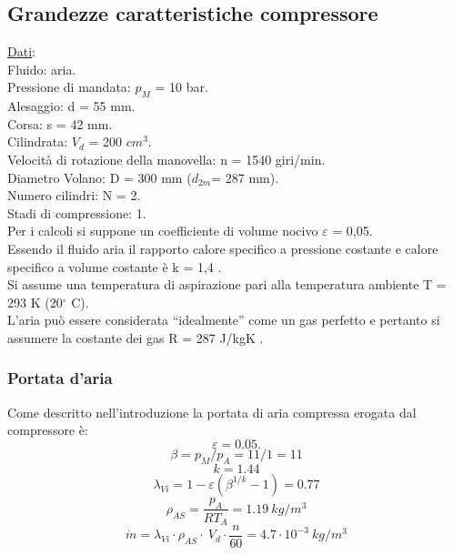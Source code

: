 \subsection{Grandezze caratteristiche compressore}

\underline{Dati}: \\
Fluido: aria. \\
Pressione di mandata: $p_M$ = 10 bar.\\
Alesaggio: d = 55 mm.\\
Corsa: s = 42 mm.\\
Cilindrata: $V_d$ = 200 $cm^3$.\\
Velocità di rotazione della manovella: n = 1540 giri/min.\\
Diametro Volano: D = 300 mm ($d_{2m}$= 287 mm). \\
Numero cilindri: N = 2.\\
Stadi di compressione: 1. \\
Per i calcoli si suppone un coefficiente di volume nocivo $\varepsilon$ = 0,05.\\
Essendo il fluido aria il rapporto calore specifico a pressione costante e calore specifico a volume costante è k = 1,4 .\\
Si assume una temperatura di aspirazione pari alla temperatura ambiente T = 293 K (20$^\circ$ C).\\
L’aria può essere considerata “idealmente” come un gas perfetto e pertanto si assumere la costante dei gas R = 287 J/kgK .
\subsubsection{Portata d'aria}
Come descritto nell’introduzione la portata di aria compressa erogata dal compressore è: 
\begin{equation}
    \varepsilon = 0.05.
\end{equation}
\begin{equation}
    \beta=p_M/p_A=11/1=11
\end{equation}
\begin{equation}
    k=1.44
\end{equation}
\begin{equation}
    \lambda_{Vi}=1-\varepsilon\left(\beta^{1/k}-1\right)=0.77
\end{equation}
\begin{equation}
    \rho_{AS}=\frac{p_A}{RT_A}=1.19\ kg/m^3
\end{equation}
\begin{equation}
    \dot{m}=\lambda_{Vi}\cdot\rho_{AS}\cdot\ V_d\cdot\frac{n}{60}=4.7\cdot{10}^{-3}\ kg/m^3
\end{equation}
